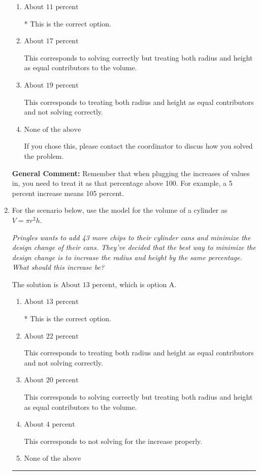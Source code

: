 \documentclass{extbook}[14pt]
\newcommand{\litem}[1]{\item #1

\rule{\textwidth}{0.4pt}}
\begin{document}
\begin{enumerate}
{\begin{enumerate}[label=\Alph*.]
This corresponds to not solving for the increase properly.
\item \( \text{About } 11 \text{ percent} \)

* This is the correct option.
\item \( \text{About } 17 \text{ percent} \)

This corresponds to solving correctly but treating both radius and height as equal contributors to the volume.
\item \( \text{About } 19 \text{ percent} \)

This corresponds to treating both radius and height as equal contributors and not solving correctly.
\item \( \text{None of the above} \)

If you chose this, please contact the coordinator to discus how you solved the problem.
\end{enumerate}

\textbf{General Comment:} Remember that when plugging the increases of values in, you need to treat it as that percentage above 100. For example, a 5 percent increase means 105 percent.
}
\litem{
For the scenario below, use the model for the volume of a cylinder as $V = \pi r^2 h$.

\begin{center}
    \textit{ Pringles wants to add 43 \text{percent} more chips to their cylinder cans and minimize the design change of their cans. They've decided that the best way to minimize the design change is to increase the radius and height by the same percentage. What should this increase be? }
\end{center}
The solution is \( \text{About } 13 \text{ percent} \), which is option A.\begin{enumerate}[label=\Alph*.]
\item \( \text{About } 13 \text{ percent} \)

* This is the correct option.
\item \( \text{About } 22 \text{ percent} \)

This corresponds to treating both radius and height as equal contributors and not solving correctly.
\item \( \text{About } 20 \text{ percent} \)

This corresponds to solving correctly but treating both radius and height as equal contributors to the volume.
\item \( \text{About } 4 \text{ percent} \)

This corresponds to not solving for the increase properly.
\item \( \text{None of the above} \)


\end{enumerate}}
\end{enumerate}
\end{document}
